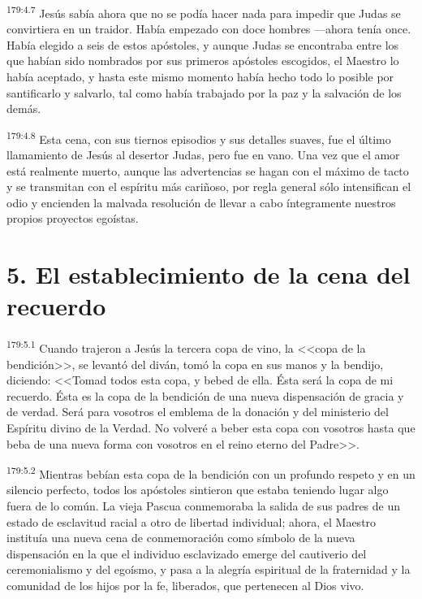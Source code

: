 \par 
\textsuperscript{179:4.7} Jesús sabía ahora que no se podía hacer nada para impedir que Judas se convirtiera en un traidor. Había empezado con doce hombres ---ahora tenía once. Había elegido a seis de estos apóstoles, y aunque Judas se encontraba entre los que habían sido nombrados por sus primeros apóstoles escogidos, el Maestro lo había aceptado, y hasta este mismo momento había hecho todo lo posible por santificarlo y salvarlo, tal como había trabajado por la paz y la salvación de los demás.

\par 
\textsuperscript{179:4.8} Esta cena, con sus tiernos episodios y sus detalles suaves, fue el último llamamiento de Jesús al desertor Judas, pero fue en vano. Una vez que el amor está realmente muerto, aunque las advertencias se hagan con el máximo de tacto y se transmitan con el espíritu más cariñoso, por regla general sólo intensifican el odio y encienden la malvada resolución de llevar a cabo íntegramente nuestros propios proyectos egoístas.

\section*{5. El establecimiento de la cena del recuerdo}
\par 
\textsuperscript{179:5.1} Cuando trajeron a Jesús la tercera copa de vino, la <<copa de la bendición>>, se levantó del diván, tomó la copa en sus manos y la bendijo, diciendo: <<Tomad todos esta copa, y bebed de ella. Ésta será la copa de mi recuerdo. Ésta es la copa de la bendición de una nueva dispensación de gracia y de verdad. Será para vosotros el emblema de la donación y del ministerio del Espíritu divino de la Verdad. No volveré a beber esta copa con vosotros hasta que beba de una nueva forma con vosotros en el reino eterno del Padre>>.

\par 
\textsuperscript{179:5.2} Mientras bebían esta copa de la bendición con un profundo respeto y en un silencio perfecto, todos los apóstoles sintieron que estaba teniendo lugar algo fuera de lo común. La vieja Pascua conmemoraba la salida de sus padres de un estado de esclavitud racial a otro de libertad individual; ahora, el Maestro instituía una nueva cena de conmemoración como símbolo de la nueva dispensación en la que el individuo esclavizado emerge del cautiverio del ceremonialismo y del egoísmo, y pasa a la alegría espiritual de la fraternidad y la comunidad de los hijos por la fe, liberados, que pertenecen al Dios vivo.

